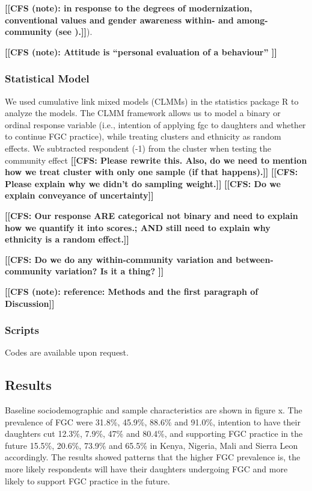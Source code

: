 \documentclass[12pt,]{article}
\newcommand{\comment}[1]{\textbf{[[#1]]}}
\newcommand{\cfcmt}[1]{\comment{CFS: #1}}
\newcommand{\cfonly}[1]{\comment{CFS (note): #1}}
\begin{document}
\cfonly {in response to the degrees of modernization, conventional values and gender awareness within- and among-community (see \cite{Achi14, BoylMcMo02, Hayf05, KandNwak09, ModrLiu13, Moor13, OdukAfol17, Youn02}).}).  

\cfonly{Attitude is “personal evaluation of a behaviour” \cite{Ajze91}}

\subsubsection{Statistical Model}\label{statistical-model}

We used cumulative link mixed models (CLMMs) in the statistics package R \cite{Rstats,Rpackage_ordinal} to analyze the models.  The CLMM framework allows us to model a binary or ordinal response variable (i.e., intention of applying fgc to daughters and whether to continue FGC practice), while treating clusters and ethnicity as random effects.  
We subtracted respondent (-1) from the cluster when testing the community effect \cfcmt{Please rewrite this. Also, do we need to mention how we treat cluster with only one sample (if that happens).}
\cfcmt{Please explain why we didn’t do sampling weight.}
\cfcmt{Do we explain conveyance of uncertainty}

\cfcmt{Our response ARE categorical not binary and need to explain how we quantify it into scores.; AND still need to explain why ethnicity is a random effect.}

\cfcmt{Do we do any within-community variation and between-community variation?  Is it a thing?
}

\cfonly{reference: Methods and the first paragraph of Discussion\cite{Chia14}}


\subsubsection{Scripts}\label{scripts}

Codes are available upon request. 

\subsection{Results}\label{results-1}

Baseline sociodemographic and sample characteristics are shown in figure x.  The prevalence of FGC were 31.8\%, 45.9\%, 88.6\% and 91.0\%, intention to have their daughters cut 12.3\%, 7.9\%, 47\% and 80.4\%, and supporting FGC practice in the future 15.5\%, 20.6\%, 73.9\% and 65.5\% in Kenya, Nigeria, Mali and Sierra Leon accordingly.  The results showed patterns that the higher FGC prevalence is, the more likely respondents will have their daughters undergoing FGC and more likely to support FGC practice in the future.  
\end{document}
